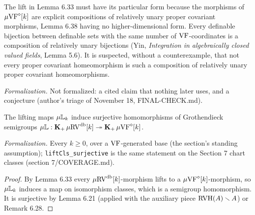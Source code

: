 \setcounter{theorem}{35}
\begin{remark}
\label{s6-relatively-unary-morphisms}
The lift in Lemma 6.33 must have its particular form because the morphisms of $\mu\mathrm{VF}^{\diamond}[k]$ are explicit compositions of relatively unary proper covariant morphisms, Lemma 6.38 having no higher-dimensional form. Every definable bijection between definable sets with the same number of $\mathrm{VF}$-coordinates is a composition of relatively unary bijections (Yin, \emph{Integration in algebraically closed valued fields}, Lemma 5.6). It is suspected, without a counterexample, that not every proper covariant homeomorphism is such a composition of relatively unary proper covariant homeomorphisms.

\emph{Formalization.} Not formalized: a cited claim that nothing later uses, and a conjecture (author's triage of November 18, FINAL-CHECK.md).
\end{remark}

\setcounter{theorem}{36}
\begin{corollary}
\label{L-sur-c}
\leanok
{}
The lifting maps $\mu\mathbb{L}_k$ induce surjective homomorphisms of Grothendieck semigroups $\mu\mathbb{L}:\operatorname{\mathbf{K}_+}\mu\mathrm{RV}^{\operatorname{db}}[k]\twoheadrightarrow\operatorname{\mathbf{K}_+}\mu\mathrm{VF}^{\diamond}[k]$.

\emph{Formalization.} Every $k\geq0$, over a $\mathrm{VF}$-generated base (the section's standing assumption); \texttt{liftCls\_surjective} is the same statement on the Section 7 chart classes (section 7/COVERAGE.md).
\end{corollary}

\begin{proof}
\leanok
By Lemma 6.33 every $\mu\mathrm{RV}^{\operatorname{db}}[k]$-morphism lifts to a $\mu\mathrm{VF}^{\diamond}[k]$-morphism, so $\mu\mathbb{L}_k$ induces a map on isomorphism classes, which is a semigroup homomorphism. It is surjective by Lemma 6.21 (applied with the auxiliary piece $\operatorname{RVH}(A)\smallsetminus A$) or Remark 6.28.
\end{proof}

